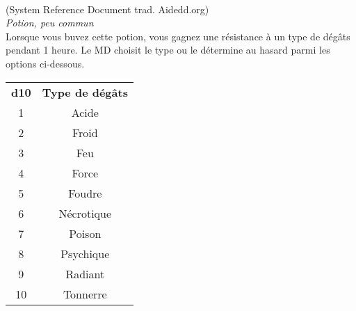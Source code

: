 \\
{\small (System Reference Document trad. Aidedd.org)}\\
{\small \it Potion, peu commun}\\
Lorsque vous buvez cette potion, vous gagnez une résistance à un type de dégâts pendant 1 heure. Le MD choisit le type ou le détermine au hasard parmi les options ci-dessous.

\begin{center}
\setlength{\tabcolsep}{4pt}
\begin{tabular}{cc}
\bf d10 & \bf Type de dégâts \\
   \rowcolor{LightCyan}
1       & Acide              \\
2       & Froid              \\
   \rowcolor{LightCyan}
3       & Feu                \\
4       & Force              \\
   \rowcolor{LightCyan}
5       & Foudre             \\
6       & Nécrotique         \\
   \rowcolor{LightCyan}
7       & Poison             \\
8       & Psychique          \\
   \rowcolor{LightCyan}
9       & Radiant            \\
10      & Tonnerre           \\
\end{tabular}
\end{center}

